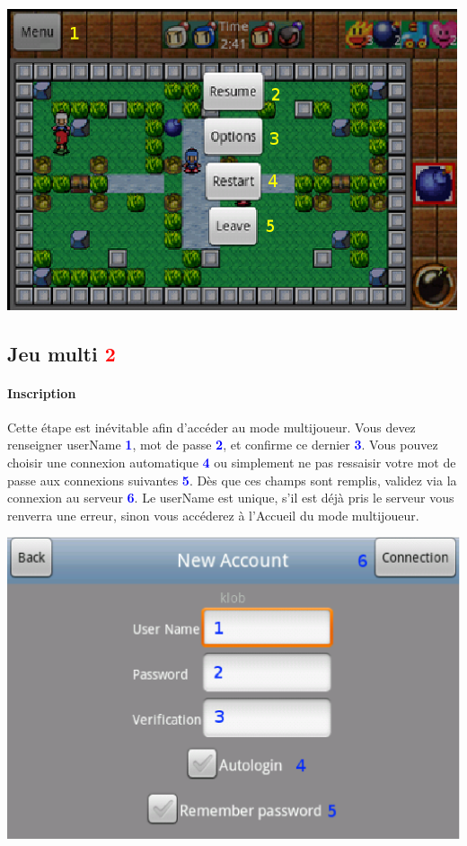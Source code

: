 	\begin{center}
		\includegraphics[scale=0.7]{Manuel/Img/20.eps}
	\end{center}


\subsection{Jeu multi \textcolor{red}{2}}

	\paragraph{Inscription}
	Cette étape est inévitable afin d'accéder au mode multijoueur. Vous devez
	renseigner userName \textcolor{blue}{\textbf{1}}, mot de passe
	\textcolor{blue}{\textbf{2}}, et confirme ce dernier
	\textcolor{blue}{\textbf{3}}. Vous pouvez choisir une connexion automatique
	\textcolor{blue}{\textbf{4}} ou simplement ne pas ressaisir votre mot de passe
	aux connexions suivantes \textcolor{blue}{\textbf{5}}. Dès que ces champs sont
	remplis, validez via la connexion au serveur \textcolor{blue}{\textbf{6}}. Le
	userName est unique, s'il est déjà pris le serveur vous renverra une erreur,
	sinon vous accéderez à l'Accueil du mode multijoueur.
	
	
	\begin{center}
		\includegraphics[scale=0.7]{Manuel/Img/18.eps}
	\end{center}
	
